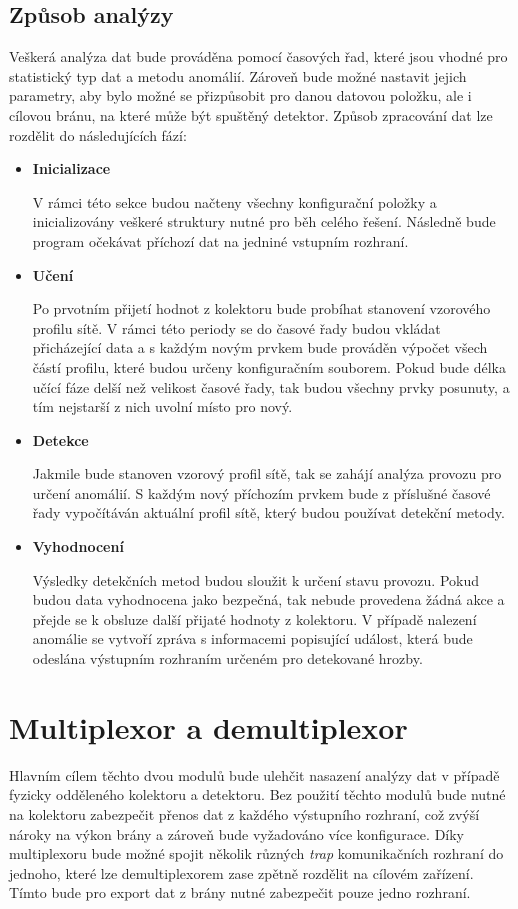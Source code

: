  
 \subsection{Způsob analýzy}
 Veškerá analýza dat bude prováděna pomocí časových řad, které jsou vhodné pro statistický typ 
 dat a metodu anomálií. Zároveň bude možné nastavit jejich parametry, aby bylo možné se přizpůsobit
 pro danou datovou položku, ale i cílovou bránu, na které může být spuštěný detektor. Způsob 
 zpracování dat lze rozdělit do následujících fází:
  \begin{itemize}
   \item \textbf{Inicializace}
   
   V rámci této sekce budou načteny všechny konfigurační položky a inicializovány veškeré struktury
   nutné pro běh celého řešení. Následně bude program očekávat příchozí dat na jedniné vstupním
   rozhraní.
   
   \item \textbf{Učení}
   
   Po prvotním přijetí hodnot z kolektoru bude probíhat stanovení vzorového profilu sítě. V rámci
   této periody se do časové řady budou vkládat přicházející data a s každým novým prvkem 
   bude prováděn výpočet všech částí profilu, které budou určeny konfiguračním souborem.
   Pokud bude délka učící fáze delší než velikost 
   časové řady, tak budou všechny prvky posunuty, a tím nejstarší z nich uvolní místo pro nový.
   
   \item \textbf{Detekce}
   
   Jakmile bude stanoven vzorový profil sítě, tak se zahájí analýza provozu pro určení anomálií.
   S každým nový příchozím prvkem bude z příslušné časové řady vypočítáván aktuální profil sítě,
   který budou používat detekční metody. 
   
   \item \textbf{Vyhodnocení}
   
   Výsledky detekčních metod budou sloužit k určení stavu provozu. Pokud budou data vyhodnocena jako
   bezpečná, tak nebude provedena žádná akce a přejde se k obsluze další přijaté hodnoty z kolektoru.
   V případě nalezení anomálie se vytvoří zpráva s informacemi popisující událost, která bude 
   odeslána výstupním rozhraním určeném pro detekované hrozby.   
  \end{itemize}
  
 \section{Multiplexor a demultiplexor}
 Hlavním cílem těchto dvou modulů bude ulehčit nasazení analýzy dat v případě fyzicky odděleného
 kolektoru a detektoru. Bez použití těchto modulů bude nutné na kolektoru zabezpečit přenos dat
 z každého výstupního rozhraní, což zvýší nároky na výkon brány a zároveň bude vyžadováno
 více konfigurace. Díky multiplexoru bude možné spojit několik různých \textit{trap} komunikačních 
 rozhraní do jednoho, které lze demultiplexorem zase zpětně rozdělit na cílovém zařízení.
 Tímto bude pro export dat z brány nutné zabezpečit pouze jedno rozhraní.

